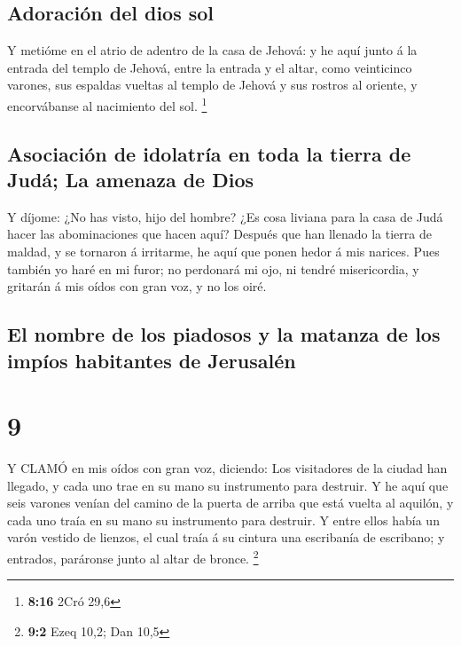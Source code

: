 \hypertarget{adoraciuxf3n-del-dios-sol}{%
\subsection{Adoración del dios sol}\label{adoraciuxf3n-del-dios-sol}}

 Y metióme en el atrio de adentro de la casa de Jehová: y
he aquí junto á la entrada del templo de Jehová, entre la entrada y el
altar, como veinticinco varones, sus espaldas vueltas al templo de
Jehová y sus rostros al oriente, y encorvábanse al nacimiento del sol.
\footnote{\textbf{8:16} 2Cró 29,6}

\hypertarget{asociaciuxf3n-de-idolatruxeda-en-toda-la-tierra-de-juduxe1-la-amenaza-de-dios}{%
\subsection{Asociación de idolatría en toda la tierra de Judá; La
amenaza de
Dios}\label{asociaciuxf3n-de-idolatruxeda-en-toda-la-tierra-de-juduxe1-la-amenaza-de-dios}}

 Y díjome: ¿No has visto, hijo del hombre? ¿Es cosa liviana
para la casa de Judá hacer las abominaciones que hacen aquí? Después que
han llenado la tierra de maldad, y se tornaron á irritarme, he aquí que
ponen hedor á mis narices.  Pues también yo haré en mi
furor; no perdonará mi ojo, ni tendré misericordia, y gritarán á mis
oídos con gran voz, y no los oiré.

\hypertarget{el-nombre-de-los-piadosos-y-la-matanza-de-los-impuxedos-habitantes-de-jerusaluxe9n}{%
\subsection{El nombre de los piadosos y la matanza de los impíos
habitantes de
Jerusalén}\label{el-nombre-de-los-piadosos-y-la-matanza-de-los-impuxedos-habitantes-de-jerusaluxe9n}}

\hypertarget{section-8}{%
\section{9}\label{section-8}}

 Y CLAMÓ en mis oídos con gran voz, diciendo: Los
visitadores de la ciudad han llegado, y cada uno trae en su mano su
instrumento para destruir.  Y he aquí que seis varones
venían del camino de la puerta de arriba que está vuelta al aquilón, y
cada uno traía en su mano su instrumento para destruir. Y entre ellos
había un varón vestido de lienzos, el cual traía á su cintura una
escribanía de escribano; y entrados, paráronse junto al altar de bronce.
\footnote{\textbf{9:2} Ezeq 10,2; Dan 10,5}


